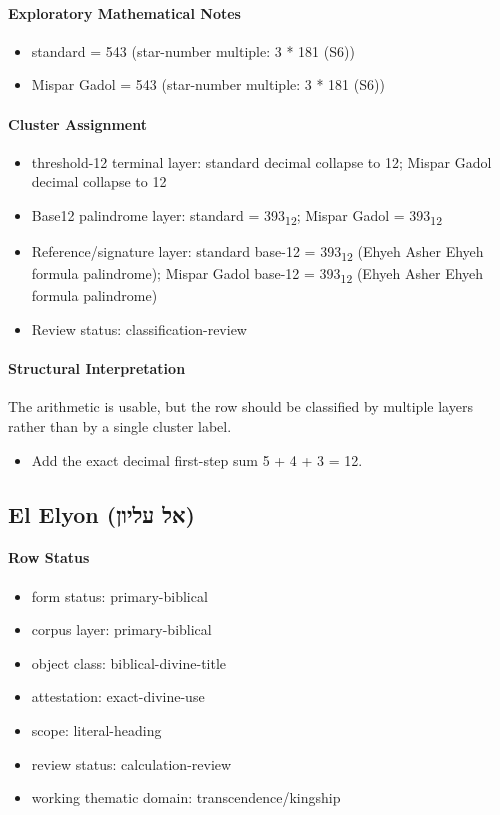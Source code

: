 \paragraph{Exploratory Mathematical Notes}
\begin{itemize}
\item standard = 543 (star-number multiple: 3 * 181 (S6))
\item Mispar Gadol = 543 (star-number multiple: 3 * 181 (S6))
\end{itemize}
\paragraph{Cluster Assignment}
\begin{itemize}
\item threshold-12 terminal layer: standard decimal collapse to 12; Mispar Gadol decimal collapse to 12
\item Base12 palindrome layer: standard = 393\textsubscript{12}; Mispar Gadol = 393\textsubscript{12}
\item Reference/signature layer: standard base-12 = 393\textsubscript{12} (Ehyeh Asher Ehyeh formula palindrome); Mispar Gadol base-12 = 393\textsubscript{12} (Ehyeh Asher Ehyeh formula palindrome)
\item Review status: classification-review
\end{itemize}
\paragraph{Structural Interpretation}
The arithmetic is usable, but the row should be classified by multiple layers rather than by a single cluster label.

\begin{itemize}
\item Add the exact decimal first-step sum 5 + 4 + 3 = 12.
\end{itemize}

\subsection{El Elyon (אל עליון)}
\paragraph{Row Status}
\begin{itemize}
\item form status: primary-biblical
\item corpus layer: primary-biblical
\item object class: biblical-divine-title
\item attestation: exact-divine-use
\item scope: literal-heading
\item review status: calculation-review
\item working thematic domain: transcendence/kingship
\end{itemize}

